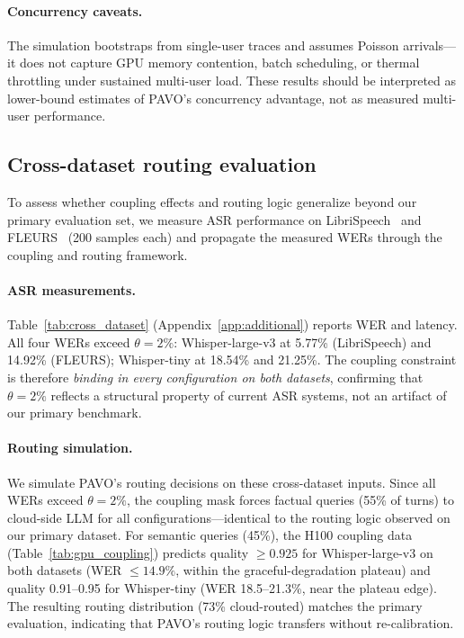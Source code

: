 \documentclass{article}
\begin{document}
\paragraph{Concurrency caveats.}
The simulation bootstraps from single-user traces and assumes Poisson arrivals---it does not capture GPU memory contention, batch scheduling, or thermal throttling under sustained multi-user load. These results should be interpreted as lower-bound estimates of PAVO's concurrency advantage, not as measured multi-user performance.

\subsection{Cross-dataset routing evaluation}
\label{sec:cross_dataset_full}

To assess whether coupling effects and routing logic generalize beyond our primary evaluation set, we measure ASR performance on LibriSpeech~\citep{panayotov2015librispeech} and FLEURS~\citep{conneau2023fleurs} (200 samples each) and propagate the measured WERs through the coupling and routing framework.

\paragraph{ASR measurements.}
Table~\ref{tab:cross_dataset} (Appendix~\ref{app:additional}) reports WER and latency. All four WERs exceed $\theta = 2\%$: Whisper-large-v3 at 5.77\% (LibriSpeech) and 14.92\% (FLEURS); Whisper-tiny at 18.54\% and 21.25\%. The coupling constraint is therefore \emph{binding in every configuration on both datasets}, confirming that $\theta = 2\%$ reflects a structural property of current ASR systems, not an artifact of our primary benchmark.

\paragraph{Routing simulation.}
We simulate PAVO's routing decisions on these cross-dataset inputs. Since all WERs exceed $\theta=2\%$, the coupling mask forces factual queries (55\% of turns) to cloud-side LLM for all configurations---identical to the routing logic observed on our primary dataset. For semantic queries (45\%), the H100 coupling data (Table~\ref{tab:gpu_coupling}) predicts quality $\geq 0.925$ for Whisper-large-v3 on both datasets (WER $\leq 14.9\%$, within the graceful-degradation plateau) and quality 0.91--0.95 for Whisper-tiny (WER 18.5--21.3\%, near the plateau edge). The resulting routing distribution (73\% cloud-routed) matches the primary evaluation, indicating that PAVO's routing logic transfers without re-calibration.
\end{document}
